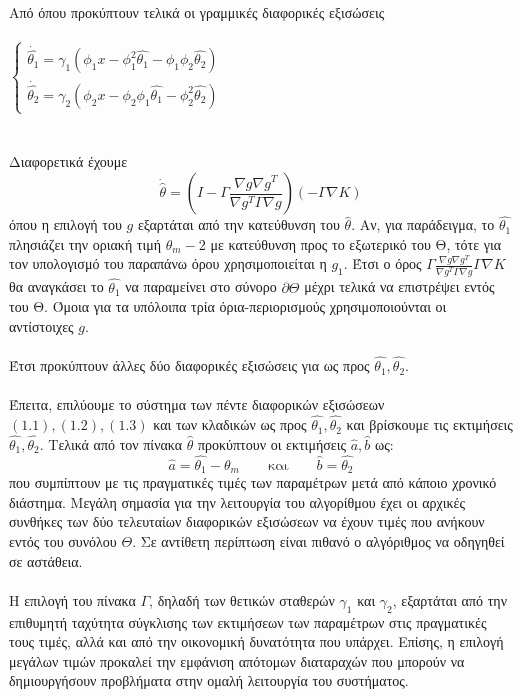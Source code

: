 \documentclass[12pt]{article}
\begin{document}
\\
Από όπου προκύπτουν τελικά οι γραμμικές διαφορικές εξισώσεις
\\ \\
$
\left\{
\begin{array}{ll}
\dot{\hat{\theta_1}}=\gamma_1 (\phi_{1}x-\phi_1^{2}\hat{\theta_1}-\phi_{1}\phi_{2}\hat{\theta_{2}})
\\
\dot{\hat{\theta_2}}=\gamma_2 (\phi_{2}x-\phi_{2}\phi_{1}\hat{\theta_1}-\phi_2^{2}\hat{\theta_{2}}) 
\end{array}
\right.
$
\\ \\ \\
Διαφορετικά έχουμε
\[\dot{\hat{\theta}}=\left( I - \Gamma \frac{\nabla g \nabla    g^{T}}{\nabla g^{T} \Gamma \nabla g}\right) (-\Gamma \nabla K)  \]
όπου η επιλογή του $g$ εξαρτάται από την κατεύθυνση του $\hat{\theta}$. Αν, για παράδειγμα, το $\hat{\theta_1}$ πλησιάζει την οριακή τιμή $\theta_m-2$ με κατεύθυνση προς το εξωτερικό του Θ, τότε για τον υπολογισμό του παραπάνω όρου χρησιμοποιείται η $g_1$. Έτσι ο όρος $\Gamma \frac{\nabla g \nabla    g^{T}}{\nabla g^{T} \Gamma \nabla g }\Gamma \nabla K$ θα αναγκάσει το $\hat{\theta_1}$ να παραμείνει στο σύνορο $\partial \Theta$ μέχρι τελικά να επιστρέψει εντός του Θ. Όμοια για τα υπόλοιπα τρία όρια-περιορισμούς χρησιμοποιούνται οι αντίστοιχες $g$.
\\ \\
Έτσι προκύπτουν άλλες δύο διαφορικές εξισώσεις για ως προς $\hat{\theta_1},\hat{\theta_2}$.
\\ \\
Έπειτα, επιλύουμε το σύστημα των πέντε διαφορικών εξισώσεων $(1.1),(1.2),(1.3)$ και των κλαδικών ως προς $\hat{\theta_1},\hat{\theta_2}$ και βρίσκουμε τις εκτιμήσεις $\hat{\theta_1},\hat{\theta_2}$. Τελικά από τον πίνακα $\hat{\theta}$ προκύπτουν οι εκτιμήσεις $\hat{a},\hat{b}$ ως:
\\
\[\hat{a}=\hat{\theta_1}-\theta_m \qquad \text{και} \qquad \hat{b}=\hat{\theta_2}\]
που συμπίπτουν με τις πραγματικές τιμές των παραμέτρων μετά από κάποιο χρονικό διάστημα. Μεγάλη σημασία για την λειτουργία του αλγορίθμου έχει οι αρχικές συνθήκες των δύο τελευταίων διαφορικών εξισώσεων να έχουν τιμές που ανήκουν εντός του συνόλου $Θ$. Σε αντίθετη περίπτωση είναι πιθανό ο αλγόριθμος να οδηγηθεί σε αστάθεια.
\\ \\
Η επιλογή του πίνακα $\Gamma$, δηλαδή των θετικών σταθερών $\gamma_1 $ και $\gamma_2$, εξαρτάται από την επιθυμητή ταχύτητα σύγκλισης των εκτιμήσεων των παραμέτρων στις πραγματικές τους τιμές, αλλά και από την οικονομική δυνατότητα που υπάρχει. Επίσης, η επιλογή μεγάλων τιμών προκαλεί την εμφάνιση απότομων διαταραχών που μπορούν να δημιουργήσουν προβλήματα στην ομαλή λειτουργία του συστήματος.
\end{document}
